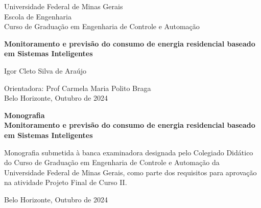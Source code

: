 \begin{titlepage}
\begin{center}
{\large Universidade Federal de Minas Gerais\\
Escola de Engenharia \\
Curso de Graduação em Engenharia de Controle e Automação\\}

\vspace{6cm}
{\bf\Large Monitoramento e previsão do consumo de energia residencial baseado em Sistemas
Inteligentes\vspace{0.2cm}}

\vspace{4cm}

{\large Igor Cleto Silva de Araújo}
\vspace{2cm}  
   
\vspace{2cm}          
{\large Orientadora: Prof Carmela Maria Polito Braga}\\

\vfill
{\large Belo Horizonte, Outubro de 2024 }
\end{center}

\end{titlepage}

\newpage
\clearpage
\thispagestyle{empty}


\begin{titlepage}

\centering
\textbf{Monografia}\\
\vspace{2cm}
\centering
\textbf{Monitoramento e previsão do consumo de energia residencial baseado em Sistemas
Inteligentes}\\
\vspace{5cm} 

\parbox{1.0\textwidth} 
{\large 
Monografia submetida à banca examinadora
designada pelo Colegiado Didático do Curso de
Graduação em Engenharia de Controle e
Automação da Universidade Federal de Minas
Gerais, como parte dos requisitos para aprovação na
atividade Projeto Final de Curso II.}

\vspace{7cm} 
\centering
Belo Horizonte, Outubro de 2024

\end{titlepage}
